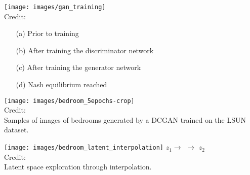 \documentclass[11pt, a4paper, landscape]{article}
\begin{document}
\NewPage{}
\vfill
	\begin{center}
		\texttt{[image: images/gan\_training]}\\

		Credit:
		\vfill
		\begin{itemize}
			\item[(a)] Prior to training
			\item[(b)] After training the discriminator network
			\item[(c)] After training the generator network
			\item[(d)] Nash equilibrium reached
		\end{itemize}
	\end{center}
\vfill


\NewPage{}
	\begin{center}
		\texttt{[image: images/bedroom\_5epochs-crop]}\\
		\vfill
		Credit: \cite{dcgan:2015}\\ Samples of images of bedrooms generated by a DCGAN trained on the
		LSUN dataset.
		\vfill
	\end{center}

\NewPage{}
	\begin{center}
    \vfill
    \centering
		\texttt{[image: images/bedroom\_latent\_interpolation]}
    \vfill
    $z_1$\hfill $\longrightarrow$ \hfill $\longrightarrow$ \hfill $z_2$\\
		\vfill
    \centering
		Credit: \cite{dcgan:2015}\\
		Latent space exploration through interpolation.
		\vfill
	\end{center}
\end{document}
